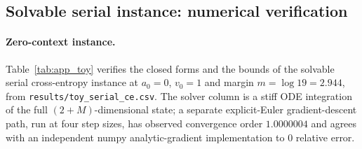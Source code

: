 \subsection{Solvable serial instance: numerical verification}
\label{app:toy}

\paragraph{Zero-context instance.} Table~\ref{tab:app_toy} verifies the closed
forms and the bounds of the solvable serial cross-entropy instance at
$a_0 = 0$, $v_0 = 1$ and margin $m = \log 19 = 2.944$, from
\texttt{results/toy\_serial\_ce.csv}. The solver column is a stiff ODE
integration of the full $(2+M)$-dimensional state; a separate explicit-Euler
gradient-descent path, run at four step sizes, has observed convergence order
$1.0000004$ and agrees with an independent numpy analytic-gradient
implementation to $0$ relative error.

